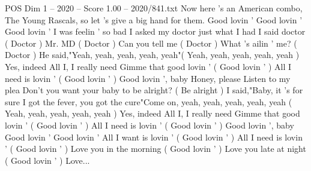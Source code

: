 \begin{textsample}{POS Dim 1 – 2020 – Score 1.00 – 2020/841.txt}  \label{ex:f1_pos_013}
Now here 's an American combo, The Young Rascals, so let 's give a big hand for them.
Good lovin ' Good lovin ' Good lovin ' I was feelin ' so bad I asked my doctor just what I had I said doctor ( Doctor ) Mr.
MD ( Doctor ) Can you tell me ( Doctor ) What 's ailin ' me? ( Doctor ) He said,"Yeah, yeah, yeah, yeah, yeah"( Yeah, yeah, yeah, yeah, yeah ) Yes, indeed All I, I really need Gimme that good lovin ' ( Good lovin ' ) All I need is lovin ' ( Good lovin ' ) Good lovin ', baby Honey, please Listen to my plea Don't you want your baby to be alright? ( Be alright ) I said,"Baby, it 's for sure I got the fever, you got the cure"Come on, yeah, yeah, yeah, yeah, yeah ( Yeah, yeah, yeah, yeah, yeah ) Yes, indeed All I, I really need Gimme that good lovin ' ( Good lovin ' ) All I need is lovin ' ( Good lovin ' ) Good lovin ', baby Good lovin ' Good lovin ' All I want is lovin ' ( Good lovin ' ) All I need is lovin ' ( Good lovin ' ) Love you in the morning ( Good lovin ' ) Love you late at night ( Good lovin ' ) Love...

\end{textsample}
